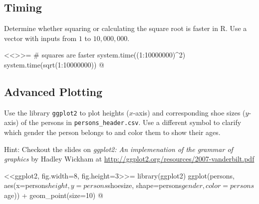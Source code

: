 \documentclass
[answers]
{exercise_sheet}
\begin{document}
\subsection*{Timing}

\begin{Question}{2}
Determine whether squaring or calculating the square root is faster in R. Use a vector with inputs from $1$ to $10,000,000$.
\end{Question}

\makeatletter\if@answers\begin{Answer}{3}
<<>>=
# squares are faster
system.time((1:10000000)^2)
system.time(sqrt(1:10000000))
@
\end{Answer}\fi\makeatother

\subsection*{Advanced Plotting}

\begin{Question}{2}
Use the library \verb|ggplot2| to plot heights ($x$-axis) and corresponding shoe sizes ($y$-axis) of the persons in \verb|persons_header.csv|. Use a different symbol to clarify which gender the person belongs to and color them to show their ages.

Hint: Checkout the slides on \emph{ggplot2: An implemenation of the grammar of graphics} by Hadley Wickham at \url{http://ggplot2.org/resources/2007-vanderbilt.pdf}
\end{Question}

\makeatletter\if@answers\begin{Answer}{1}
<<ggplot2, fig.width=8, fig.height=3>>=
library(ggplot2)
ggplot(persons, 
       aes(x=persons$height, y=persons$shoesize, shape=persons$gender,
           color=persons$age)) + 
  geom_point(size=10)
@
\end{Answer}\fi\makeatother
\end{document}
